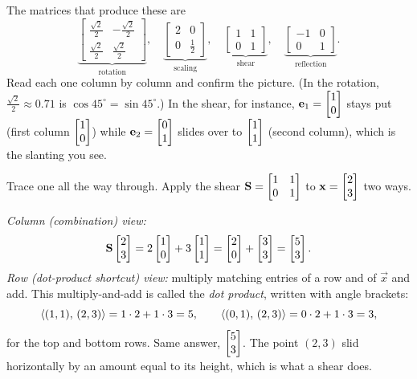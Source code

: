 The matrices that produce these are
\[
\underbrace{\begin{bmatrix} \tfrac{\sqrt2}{2} & -\tfrac{\sqrt2}{2}\\[2pt] \tfrac{\sqrt2}{2} & \tfrac{\sqrt2}{2}\end{bmatrix}}_{\text{rotation}},\quad
\underbrace{\begin{bmatrix} 2 & 0\\ 0 & \tfrac12\end{bmatrix}}_{\text{scaling}},\quad
\underbrace{\begin{bmatrix} 1 & 1\\ 0 & 1\end{bmatrix}}_{\text{shear}},\quad
\underbrace{\begin{bmatrix} -1 & 0\\ 0 & 1\end{bmatrix}}_{\text{reflection}}.
\]
Read each one column by column and confirm the picture. (In the rotation, $\tfrac{\sqrt2}{2}\approx 0.71$
is $\cos 45^\circ=\sin 45^\circ$.) In the shear, for instance, $\mathbf{e}_1=\begin{bmatrix}1\\0\end{bmatrix}$
stays put (first column $\begin{bmatrix}1\\0\end{bmatrix}$) while $\mathbf{e}_2=\begin{bmatrix}0\\1\end{bmatrix}$ slides over to $\begin{bmatrix}1\\1\end{bmatrix}$
(second column), which is the slanting you see.

\begin{example}
Trace one all the way through. Apply the shear $\mathbf{S} = \begin{bmatrix}1&1\\0&1\end{bmatrix}$ to
$\mathbf{x}=\begin{bmatrix}2\\3\end{bmatrix}$ two ways.

\emph{Column (combination) view:}
\[
\mathbf{S}\begin{bmatrix}2\\3\end{bmatrix} = 2\begin{bmatrix}1\\0\end{bmatrix} + 3\begin{bmatrix}1\\1\end{bmatrix} = \begin{bmatrix}2\\0\end{bmatrix}+\begin{bmatrix}3\\3\end{bmatrix}=\begin{bmatrix}5\\3\end{bmatrix}.
\]
\emph{Row (dot-product shortcut) view:} multiply matching entries of a row and of $\vec x$ and add. This
multiply-and-add is called the \emph{dot product}, written with angle brackets:
\[
\langle (1,1),\, (2,3) \rangle = 1\cdot2+1\cdot3 = 5,
\qquad
\langle (0,1),\, (2,3) \rangle = 0\cdot2+1\cdot3 = 3,
\]
for the top and bottom rows. Same answer, $\begin{bmatrix}5\\3\end{bmatrix}$. The point $(2,3)$ slid
horizontally by an amount equal to its height, which is what a shear does.
\end{example}

